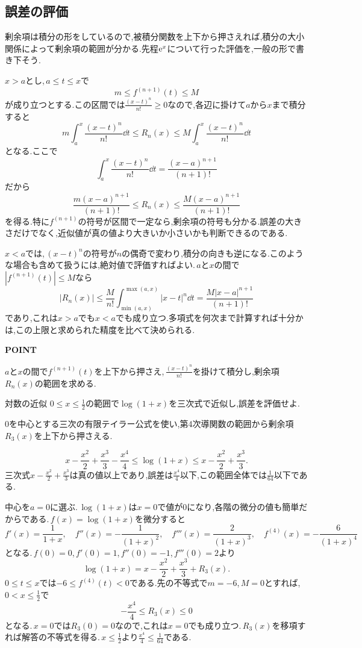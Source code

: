 \subsection{誤差の評価}

剰余項は積分の形をしているので,被積分関数を上下から押さえれば,積分の大小関係によって剰余項の範囲が分かる.先程$\mathrm{e}^x$について行った評価を,一般の形で書き下そう.

$x>a$とし,\,$a\le t\le x$で
\[
 m\le f^{(n+1)}(t)\le M
\]
が成り立つとする.この区間では$\frac{(x-t)^n}{n!}\ge0$なので,各辺に掛けて$a$から$x$まで積分すると
\[
 m\int_a^x\frac{(x-t)^n}{n!}\dd t
 \le R_n(x)
 \le M\int_a^x\frac{(x-t)^n}{n!}\dd t
\]
となる.ここで
\[
 \int_a^x\frac{(x-t)^n}{n!}\dd t=\frac{(x-a)^{n+1}}{(n+1)!}
\]
だから
\[
 \frac{m(x-a)^{n+1}}{(n+1)!}
 \le R_n(x)
 \le\frac{M(x-a)^{n+1}}{(n+1)!}
\]
を得る.特に$f^{(n+1)}$の符号が区間で一定なら,剰余項の符号も分かる.誤差の大きさだけでなく,近似値が真の値より大きいか小さいかも判断できるのである.

$x<a$では,\,$(x-t)^n$の符号が$n$の偶奇で変わり,積分の向きも逆になる.このような場合も含めて扱うには,絶対値で評価すればよい.\,$a$と$x$の間で$|f^{(n+1)}(t)|\le M$なら
\[
 |R_n(x)|
 \le\frac{M}{n!}\int_{\min(a,x)}^{\max(a,x)}|x-t|^n\dd t
 =\frac{M|x-a|^{n+1}}{(n+1)!}
\]
であり,これは$x>a$でも$x<a$でも成り立つ.多項式を何次まで計算すれば十分かは,この上限と求められた精度を比べて決められる.

\begin{bookpoint}
\textbf{POINT}\par
$a$と$x$の間で$f^{(n+1)}(t)$を上下から押さえ,\,$\frac{(x-t)^n}{n!}$を掛けて積分し,剰余項$R_n(x)$の範囲を求める.
\end{bookpoint}

\begin{example}{対数の近似}
$0\le x\le\frac12$の範囲で$\log(1+x)$を三次式で近似し,誤差を評価せよ.
\end{example}

$0$を中心とする三次の有限テイラー公式を使い,第4次導関数の範囲から剰余項$R_3(x)$を上下から押さえる.

\[
 x-\frac{x^2}{2}+\frac{x^3}{3}-\frac{x^4}{4}
 \le\log(1+x)
 \le x-\frac{x^2}{2}+\frac{x^3}{3}.
\]
三次式$x-\frac{x^2}{2}+\frac{x^3}{3}$は真の値以上であり,誤差は$\frac{x^4}{4}$以下,この範囲全体では$\frac1{64}$以下である.

中心を$a=0$に選ぶ.\,$\log(1+x)$は$x=0$で値が$0$になり,各階の微分の値も簡単だからである.\,$f(x)=\log(1+x)$を微分すると
\[
 f'(x)=\frac{1}{1+x},\quad
 f''(x)=-\frac{1}{(1+x)^2},\quad
 f'''(x)=\frac{2}{(1+x)^3},\quad
 f^{(4)}(x)=-\frac{6}{(1+x)^4}
\]
となる.\,$f(0)=0$,\,$f'(0)=1$,\,$f''(0)=-1$,\,$f'''(0)=2$より
\[
 \log(1+x)=x-\frac{x^2}{2}+\frac{x^3}{3}+R_3(x).
\]
$0\le t\le x$では$-6\le f^{(4)}(t)<0$である.先の不等式で$m=-6$,\,$M=0$とすれば,\,$0<x\le\frac12$で
\[
 -\frac{x^4}{4}\le R_3(x)\le0
\]
となる.\,$x=0$では$R_3(0)=0$なので,これは$x=0$でも成り立つ.\,$R_3(x)$を移項すれば解答の不等式を得る.\,$x\le\frac12$より$\frac{x^4}{4}\le\frac1{64}$である.

